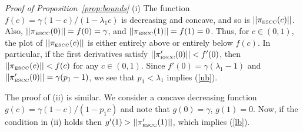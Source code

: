 \documentclass{article}
\newcommand{\escc}{{\mbox{\tiny ESCC}}}
\begin{document}
\medskip

{\it Proof of Proposition~\ref{prop:bounds}} (i) The function $f(c)=\gamma(1-c)/(1-\lambda_1 c)$
is decreasing and concave, and so is $||\pi_\escc(c)||$. Also,
$||\pi_\escc(0)||=f(0)=\gamma$, and $||\pi_\escc(1)||=f(1)=0$.
Thus, for $c\in (0,1)$, the plot of $||\pi_\escc(c)||$ is either
entirely above or entirely below $f(c)$. In particular, if the
first derivatives satisfy $||\pi'_\escc(0)||<f'(0)$, then
$||\pi_\escc(c)||<f(c)$ for any $c\in(0,1)$. Since
$f'(0)=\gamma(\lambda_1-1)$ and $||\pi'_\escc(0)||=\gamma(p_1-1)$,
we see that $p_1<\lambda_1$ implies (\ref{ub}).

The proof of (ii) is similar. We consider a concave decreasing
function $g(c)=\gamma(1-c)/(1-p_1 c)$ and note that $g(0)=\gamma$,
$g(1)=0$. Now, if the condition in (ii) holds then
$g'(1)>||\pi'_\escc(1)||$, which implies (\ref{lb}).
\end{document}

